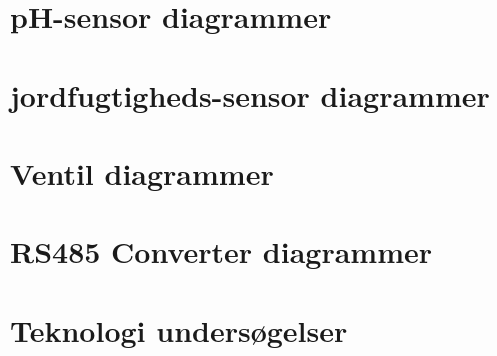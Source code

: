 \newpage

\section{pH-sensor diagrammer}



\newpage

\section{jordfugtigheds-sensor diagrammer}



\newpage

\section{Ventil diagrammer}



\newpage

\section{RS485 Converter diagrammer}

\newpage

\section{Teknologi undersøgelser}

